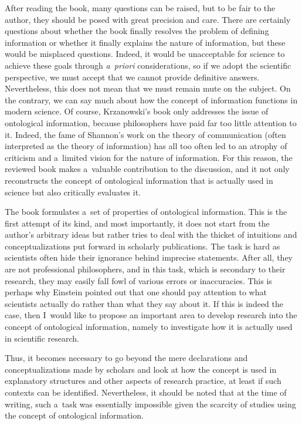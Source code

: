 After reading the book, many questions can be raised, but to be fair to the author, they should be posed with great precision and care. There are certainly questions about whether the book finally resolves the problem of defining information or whether it finally explains the nature of information, but these would be misplaced questions. Indeed, it would be unacceptable for science to achieve these goals through \textit{a~priori} considerations, so if we adopt the scientific perspective, we must accept that we cannot provide definitive answers. Nevertheless, this does not mean that we must remain mute on the subject. On the contrary, we can say much about how the concept of information functions in modern science. Of course, Krzanowski's book only addresses the issue of ontological information, because philosophers have paid far too little attention to it. Indeed, the fame of Shannon's work on the theory of communication (often interpreted as the theory of information) has all too often led to an atrophy of criticism and a~limited vision for the nature of information. For this reason, the reviewed book makes a~valuable contribution to the discussion, and it not only reconstructs the concept of ontological information that is actually used in science but also critically evaluates it.

The book formulates a~set of properties of ontological information. This is the first attempt of its kind, and most importantly, it does not start from the author's arbitrary ideas but rather tries to deal with the thicket of intuitions and conceptualizations put forward in scholarly publications. The task is hard as scientists often hide their ignorance behind imprecise statements. After all, they are not professional philosophers, and in this task, which is secondary to their research, they may easily fall fowl of various errors or inaccuracies. This is perhaps why Einstein pointed out that one should pay attention to what scientists actually do rather than what they say about it. If this is indeed the case, then I~would like to propose an important area to develop research into the concept of ontological information, namely to investigate how it is actually used in scientific research.

Thus, it becomes necessary to go beyond the mere declarations and conceptualizations made by scholars and look at how the concept is used in explanatory structures and other aspects of research practice, at least if such contexts can be identified. Nevertheless, it should be noted that at the time of writing, such a~task was essentially impossible given the scarcity of studies using the concept of ontological information.

